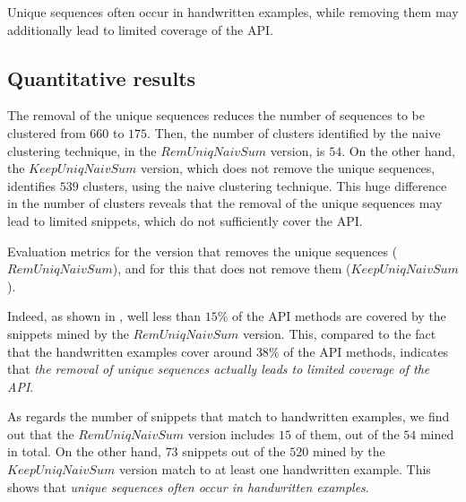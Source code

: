 \begin{hypothesis}
Unique sequences often occur in handwritten examples, while removing them may additionally lead to limited coverage of the API.
\end{hypothesis}


\subsection{Quantitative results}
\label{subsec:evaluation-exp2-quantitative}

The removal of the unique sequences reduces the number of sequences to be clustered from $660$ to $175$. Then, the number of clusters identified by the naive clustering technique, in the $RemUniqNaivSum$ version, is $54$. On the other hand, the $KeepUniqNaivSum$ version, which does not remove the unique sequences, identifies $539$ clusters, using the naive clustering technique. This huge difference in the number of clusters reveals that the removal of the unique sequences may lead to limited snippets, which do not sufficiently cover the API.

\begin{table}[ht]
\centering
\small
\caption[Evaluation metrics\protect\\($RemUniqNaivSum$, $KeepUniqNaivSum$)]{Evaluation metrics for the version that removes the unique sequences ($RemUniqNaivSum$), and for this that does not remove them ($KeepUniqNaivSum$).}
\label{tables:evaluation-preprocessor}

\end{table}

Indeed, as shown in , well less than $15\%$ of the API methods are covered by the snippets mined by the $RemUniqNaivSum$ version. This, compared to the fact that the handwritten examples cover around $38\%$ of the API methods, indicates that \textit{the removal of unique sequences actually leads to limited coverage of the API}.

As regards the number of snippets that match to handwritten examples, we find out that the $RemUniqNaivSum$ version includes $15$ of them, out of the $54$ mined in total. On the other hand, $73$ snippets out of the $520$ mined by the $KeepUniqNaivSum$ version match to at least one handwritten example. This shows that \textit{unique sequences often occur in handwritten examples}.

